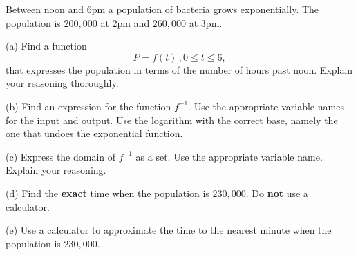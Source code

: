 \documentclass{ximera}
\begin{document}
\begin{question} \label{Q7:LogF}
Between noon and 6pm a population of bacteria grows exponentially. The population is $200,000$ at 2pm and $260,000$ at 3pm.

(a) Find a function 
\[
     P = f(t) \, , 0\leq t \leq 6 ,
\]
that expresses the population in terms of the number of hours past noon. Explain your reasoning thoroughly.

(b) Find an expression for the function $f^{-1}$. Use the appropriate variable names for the input and output. Use the logarithm with the correct base, namely the one that undoes the exponential function.

(c) Express the domain of $f^{-1}$ as a set. Use the appropriate variable name. Explain your reasoning.

(d) Find the {\bf exact} time when the population is $230,000$. Do {\bf not} use a calculator.

(e) Use a calculator to approximate the time to the nearest minute when the population is $230,000$.




\end{question}
\end{document}
